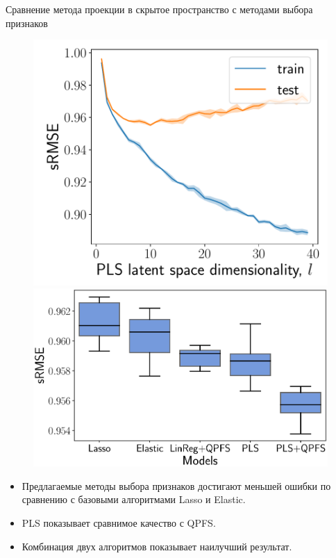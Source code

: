 \documentclass[10pt]{beamer}
\begin{document}
\begin{frame}{Сравнение метода проекции в скрытое пространство с методами выбора признаков}

\begin{figure}[h]
	\begin{minipage}{.43\linewidth}
		\centering
		\includegraphics[width=1.\linewidth]{figs/pls_vs_k}
	\end{minipage}%
	\begin{minipage}{.57\linewidth}
		\centering
		\includegraphics[width=1.\linewidth]{figs/models2}
	\end{minipage}
\end{figure}
\begin{itemize}
	\item Предлагаемые методы выбора признаков достигают меньшей ошибки по сравнению с базовыми алгоритмами Lasso и Elastic.
	\item PLS показывает сравнимое качество с QPFS.
	\item Комбинация двух алгоритмов показывает наилучший результат.
\end{itemize}

\end{frame}
\end{document}
